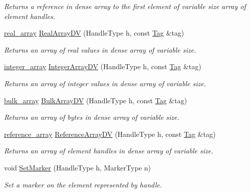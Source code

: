 \begin{DoxyCompactItemize}
\begin{DoxyCompactList}\small\item\em Returns a reference in dense array to the first element of variable size array of element handles. \end{DoxyCompactList}\item 
\hyperlink{classINMOST_1_1Storage_a430e5358d435befb38169beef593527e}{real\-\_\-array} \hyperlink{classINMOST_1_1Mesh_ae7a5f7d22e5b9f7c01b9741719b853dc}{Real\-Array\-D\-V} (Handle\-Type h, const \hyperlink{classINMOST_1_1Tag}{Tag} \&tag)
\begin{DoxyCompactList}\small\item\em Returns an array of real values in dense array of variable size. \end{DoxyCompactList}\item 
\hyperlink{classINMOST_1_1Storage_a4d1637367f0487eb778894b57fc94647}{integer\-\_\-array} \hyperlink{classINMOST_1_1Mesh_ad74aed700689551567039dfddfbf5971}{Integer\-Array\-D\-V} (Handle\-Type h, const \hyperlink{classINMOST_1_1Tag}{Tag} \&tag)
\begin{DoxyCompactList}\small\item\em Returns an array of integer values in dense array of variable size. \end{DoxyCompactList}\item 
\hyperlink{classINMOST_1_1Storage_a6e49b2a38cb55dd59529bd23e8b1b852}{bulk\-\_\-array} \hyperlink{classINMOST_1_1Mesh_a042974abc70e48b9dc84714ca1a50655}{Bulk\-Array\-D\-V} (Handle\-Type h, const \hyperlink{classINMOST_1_1Tag}{Tag} \&tag)
\begin{DoxyCompactList}\small\item\em Returns an array of bytes in dense array of variable size. \end{DoxyCompactList}\item 
\hyperlink{classINMOST_1_1Storage_1_1reference__array}{reference\-\_\-array} \hyperlink{classINMOST_1_1Mesh_aa2a8c6f6d53a863be14b2c137de4eff5}{Reference\-Array\-D\-V} (Handle\-Type h, const \hyperlink{classINMOST_1_1Tag}{Tag} \&tag)
\begin{DoxyCompactList}\small\item\em Returns an array of element handles in dense array of variable size. \end{DoxyCompactList}\item 
void \hyperlink{classINMOST_1_1Mesh_ab0eb79ff655477197ce21dedae4712d4}{Set\-Marker} (Handle\-Type h, Marker\-Type n)
\begin{DoxyCompactList}\small\item\em Set a marker on the element represented by handle. \end{DoxyCompactList}\item 

\end{DoxyCompactItemize}
